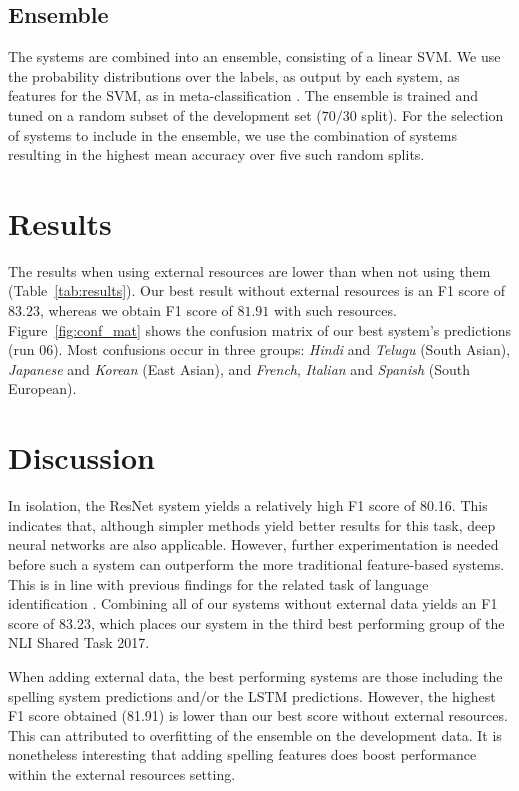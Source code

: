 \documentclass[11pt,letterpaper]{article}
\begin{document}
\subsection{Ensemble}
The systems are combined into an ensemble, consisting of a linear SVM.
We use the probability distributions over the labels, as output by each system, as features for the SVM, as in meta-classification \citep{malmasi:2017:nlisg}.
The ensemble is trained and tuned on a random subset of the development set ($70/30$ split).
For the selection of systems to include in the ensemble, we use the combination of systems resulting in the highest mean accuracy over five such random splits.


\section{Results}
The results when using external resources are lower than when not using them (Table~\ref{tab:results}).
Our best result without external resources is an F1 score of $83.23$, whereas we obtain F1 score of $81.91$ with such resources.
Figure~\ref{fig:conf_mat} shows the confusion matrix of our best system's predictions (run 06).
Most confusions occur in three groups: \textit{Hindi} and \textit{Telugu} (South Asian), \textit{Japanese} and \textit{Korean} (East Asian), and \textit{French}, \textit{Italian} and \textit{Spanish} (South European).


\section{Discussion}

In isolation, the ResNet system yields a relatively high F1 score of 80.16.
This indicates that, although simpler methods yield better results for this task, deep neural networks are also applicable.
However, further experimentation is needed before such a system can outperform the more traditional feature-based systems.
This is in line with previous findings for the related task of language identification \citep{medvedeva:2017,vardial2017}.
Combining all of our systems without external data yields an F1 score of 83.23, which places our system in the third best performing group of the NLI Shared Task 2017.

When adding external data, the best performing systems are those including the spelling system predictions and/or the LSTM predictions.
However, the highest F1 score obtained (81.91) is lower than our best score without external resources.
This can attributed to overfitting of the ensemble on the development data.
It is nonetheless interesting that adding spelling features does boost performance within the external resources setting.
\end{document}
